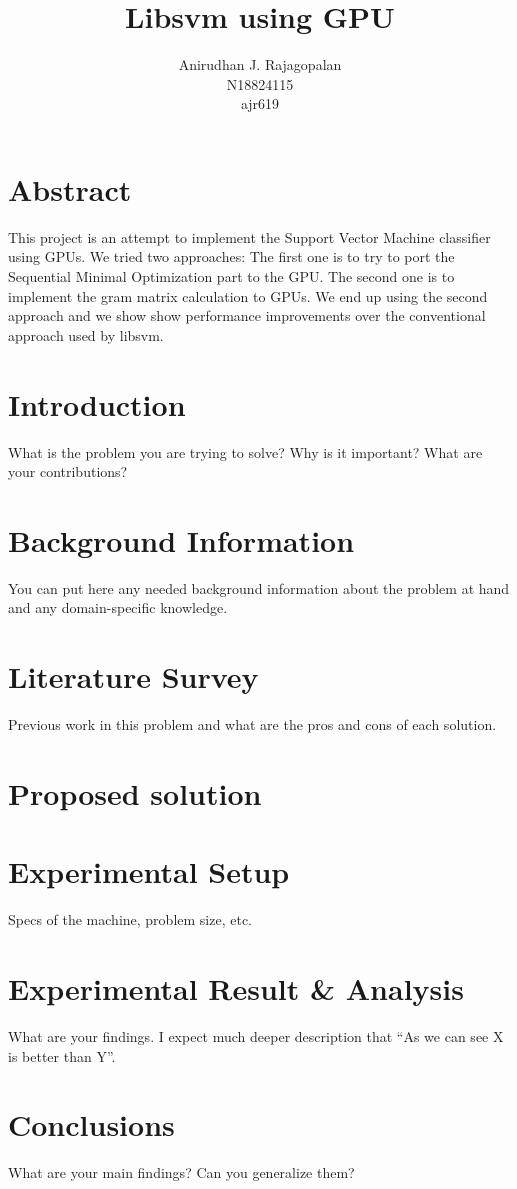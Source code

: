 \documentclass{article}
\begin{document}
\title{Libsvm using GPU}
\author{Anirudhan J. Rajagopalan \\ N18824115 \\ ajr619}
\maketitle




\newpage

\section{Abstract}
This project is an attempt to implement the Support Vector Machine classifier using GPUs.
We tried two approaches: 
The first one is to try to port the Sequential Minimal Optimization part to the GPU\@.
The second one is to implement the gram matrix calculation to GPUs.
We end up using the second approach and we show show performance improvements over the conventional approach used by libsvm. 
\section{Introduction}
What is the problem you are trying to solve? Why is it important? What are your contributions?
\section{Background Information}
You can put here any needed background information about the problem at hand and any domain-specific knowledge.
\section{Literature Survey}
Previous work in this problem and what are the pros and cons of each solution.
\section{Proposed solution}
\section{Experimental Setup}
Specs of the machine, problem size, etc.
\section{Experimental Result \& Analysis}
What are your findings. I expect much deeper description that ``As we can see X is better than Y''.
\section{Conclusions}
What are your main findings? Can you generalize them?



\end{document}

